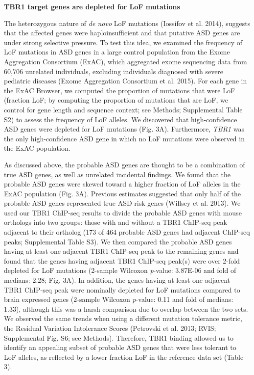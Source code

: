 \documentclass[]{article}
\begin{document}
\textbf{TBR1 target genes are depleted for LoF mutations}

The heterozygous nature of \emph{de novo} LoF mutations (Iossifov et al.
2014), suggests that the affected genes were haploinsufficient and that
putative ASD genes are under strong selective pressure. To test this
idea, we examined the frequency of LoF mutations in ASD genes in a large
control population from the Exome Aggregation Consortium (ExAC), which
aggregated exome sequencing data from 60,706 unrelated individuals,
excluding individuals diagnosed with severe pediatric diseases (Exome
Aggregation Consortium et al. 2015). For each gene in the ExAC Browser,
we computed the proportion of mutations that were LoF (fraction LoF; by
computing the proportion of mutations that are LoF, we control for gene
length and sequence context; see Methods; Supplemental Table S2) to
assess the frequency of LoF alleles. We discovered that high-confidence
ASD genes were depleted for LoF mutations (Fig. 3A). Furthermore,
\emph{TBR1} was the only high-confidence ASD gene in which no LoF
mutations were observed in the ExAC population.

As discussed above, the probable ASD genes are thought to be a
combination of true ASD genes, as well as unrelated incidental findings.
We found that the probable ASD genes were skewed toward a higher
fraction of LoF alleles in the ExAC population (Fig. 3A). Previous
estimates suggested that only half of the probable ASD genes represented
true ASD risk genes (Willsey et al. 2013). We used our TBR1 ChIP-seq
results to divide the probable ASD genes with mouse orthologs into two
groups: those with and without a TBR1 ChIP-seq peak adjacent to their
ortholog (173 of 464 probable ASD genes had adjacent ChIP-seq peaks;
Supplemental Table S3). We then compared the probable ASD genes having
at least one adjacent TBR1 ChIP-seq peak to the remaining genes and
found that the genes having adjacent TBR1 ChIP-seq peak(s) were over
2-fold depleted for LoF mutations (2-sample Wilcoxon \emph{p}-value:
3.87E-06 and fold of medians: 2.28; Fig. 3A). In addition, the genes
having at least one adjacent TBR1 ChIP-seq peak were nominally depleted
for LoF mutations compared to brain expressed genes (2-sample Wilcoxon
\emph{p}-value: 0.11 and fold of medians: 1.33), although this was a
harsh comparison due to overlap between the two sets. We observed the
same trends when using a different mutation tolerance metric, the
Residual Variation Intolerance Scores (Petrovski et al. 2013; RVIS;
Supplemental Fig. S6; see Methods). Therefore, TBR1 binding allowed us
to identify an appealing subset of probable ASD genes that were less
tolerant to LoF alleles, as reflected by a lower fraction LoF in the
reference data set (Table 3).
\end{document}
